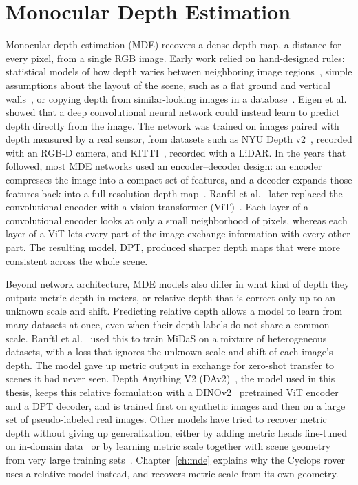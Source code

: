 \section{Monocular Depth Estimation}
\label{sec:rw-mde}

Monocular depth estimation (MDE) recovers a dense depth map, a distance for every pixel, from a
single RGB image. Early work relied on hand-designed rules: statistical models of how depth varies
between neighboring image regions~\cite{Saxena2009Make3D}, simple assumptions about the layout of
the scene, such as a flat ground and vertical walls~\cite{Hoiem2005PopUp}, or copying depth from
similar-looking images in a database~\cite{Karsch2014DepthTransfer}.
Eigen et al.~\cite{Eigen} showed that a deep convolutional neural network could instead learn to
predict depth directly from the image. The network was trained on images paired with depth
measured by a real sensor, from datasets such as NYU Depth v2~\cite{NYUD}, recorded with an RGB-D
camera, and KITTI~\cite{kitti}, recorded with a LiDAR.
In the years that followed, most MDE networks used an encoder--decoder design: an encoder
compresses the image into a compact set of features, and a decoder expands those features back
into a full-resolution depth map~\cite{MiDaS,Ming2021MDEReview}.
Ranftl et al.~\cite{DPT} later replaced the convolutional encoder with a vision transformer
(ViT)~\cite{ViT}. Each layer of a convolutional encoder looks at only a small neighborhood of
pixels, whereas each layer of a ViT lets every part of the image exchange information with every
other part. The
resulting model, DPT, produced sharper depth maps that were more consistent across the whole
scene.

Beyond network architecture, MDE models also differ in what kind of depth they output: metric
depth in meters, or relative depth that is correct only up to an unknown scale and shift.
Predicting relative depth allows a model to learn from many datasets at once, even when their
depth labels do not share a common scale. Ranftl et al.~\cite{MiDaS} used this to train MiDaS on
a mixture of heterogeneous datasets, with a loss that ignores the unknown scale and shift of each
image's depth. The model gave up metric output in exchange for zero-shot transfer to scenes it had
never seen. Depth Anything V2 (DAv2)~\cite{DepthAnythingV2}, the model used in this thesis, keeps this
relative formulation with a DINOv2~\cite{DINOv2} pretrained ViT encoder and a DPT decoder, and is
trained first on synthetic images and then on a large set of pseudo-labeled real images. Other
models have tried to recover metric depth without giving up generalization, either by adding
metric heads fine-tuned on in-domain data~\cite{zoedepth} or by learning metric scale together with
scene geometry from very large training sets~\cite{MoGe}. Chapter~\ref{ch:mde} explains why the
Cyclops rover uses a relative model instead, and recovers metric scale from its own geometry.

